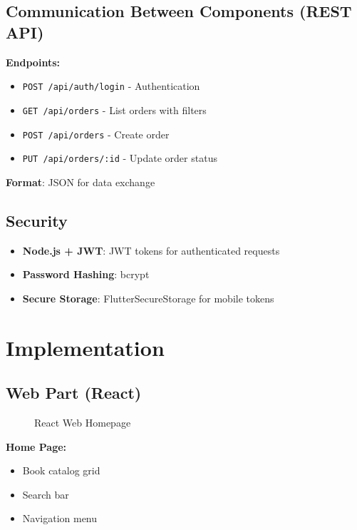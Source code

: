 \documentclass[12pt,a4paper]{article}
\begin{document}
\subsection{Communication Between Components (REST API)}

\textbf{Endpoints:}
\begin{itemize}
    \item \texttt{POST /api/auth/login} - Authentication
    \item \texttt{GET /api/orders} - List orders with filters
    \item \texttt{POST /api/orders} - Create order
    \item \texttt{PUT /api/orders/:id} - Update order status
\end{itemize}

\textbf{Format}: JSON for data exchange

\subsection{Security}

\begin{itemize}
    \item \textbf{Node.js + JWT}: JWT tokens for authenticated requests
    \item \textbf{Password Hashing}: bcrypt
    \item \textbf{Secure Storage}: FlutterSecureStorage for mobile tokens
\end{itemize}

\newpage

\section{Implementation}

\subsection{Web Part (React)}

\begin{figure}[h]
    \centering
    \caption{React Web Homepage}
\end{figure}

\textbf{Home Page:}
\begin{itemize}
    \item Book catalog grid
    \item Search bar
    \item Navigation menu
\end{itemize}
\end{document}
